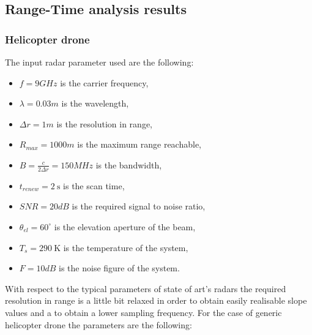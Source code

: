 \subsection{Range-Time analysis results}
\subsubsection{Helicopter drone}
The input radar parameter used are the following:
\begin{itemize}
    
    \item $f=9 GHz$ is the carrier frequency,
         
    \item $\lambda = 0.03 m$ is the wavelength,

    \item $\Delta r = 1 m$ is the resolution in range,
    
    \item $R_{max} = 1000m$ is the maximum range reachable,
    
    \item $B=\frac{c}{2 \Delta r} = 150 MHz$ is the bandwidth,
    
    \item $t_{renew}= 2 \mathrm{~s}$ is the scan time,
    
    \item $SNR = 20 dB$ is the required signal to noise ratio,
    
    \item $\theta_{el}=60^{\circ}$ is the elevation aperture of the beam,
    
    \item $T_{s}=290 \mathrm{~K}$ is the temperature of the system,
    
    \item $F = 10 dB $ is the noise figure of the system.
    
\end{itemize}

 With respect to the typical parameters of state of art's radars the required resolution in range is a little bit relaxed in order to obtain easily realisable slope values and a to obtain a lower sampling frequency.
For the case of generic helicopter drone the parameters are the following:

